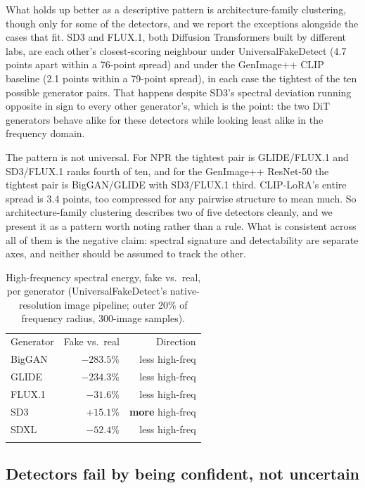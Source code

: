 \documentclass[3p,times,procedia]{elsarticle}
\begin{document}
What holds up better as a descriptive pattern is architecture-family
clustering, though only for some of the detectors, and we report the
exceptions alongside the cases that fit. SD3 and FLUX.1, both Diffusion
Transformers built by different labs,
are each other's closest-scoring neighbour under UniversalFakeDetect (4.7
points apart within a 76-point spread) and under the GenImage++ CLIP
baseline (2.1 points within a 79-point spread), in each case the tightest
of the ten possible generator pairs. That happens despite SD3's spectral
deviation running opposite in sign to every other generator's, which is the
point: the two DiT generators behave alike for these detectors while
looking least alike in the frequency domain.

The pattern is not universal. For NPR the tightest pair is GLIDE/FLUX.1 and
SD3/FLUX.1 ranks fourth of ten, and for the GenImage++ ResNet-50 the
tightest pair is BigGAN/GLIDE with SD3/FLUX.1 third. CLIP-LoRA's entire
spread is 3.4 points, too compressed for any pairwise structure to mean
much. So architecture-family clustering describes two of five detectors
cleanly, and we present it as a pattern worth noting rather than a rule.
What is consistent across all of them is the negative claim: spectral
signature and detectability are separate axes, and neither should be
assumed to track the other.

\begin{table}[h]
\caption{High-frequency spectral energy, fake vs.\ real, per generator
(UniversalFakeDetect's native-resolution image pipeline; outer 20\% of
frequency radius, 300-image samples).}
\label{tab:hfenergy}
\begin{tabular*}{\hsize}{@{\extracolsep{\fill}}lrr@{}}
\toprule
Generator & Fake vs.\ real & Direction \\
\colrule
BigGAN & $-283.5\%$ & less high-freq \\
GLIDE & $-234.3\%$ & less high-freq \\
FLUX.1 & $-31.6\%$ & less high-freq \\
SD3 & $+15.1\%$ & \textbf{more} high-freq \\
SDXL & $-52.4\%$ & less high-freq \\
\botrule
\end{tabular*}
\end{table}

\subsection{Detectors fail by being confident, not uncertain}
\label{sec:confidence}
\end{document}
